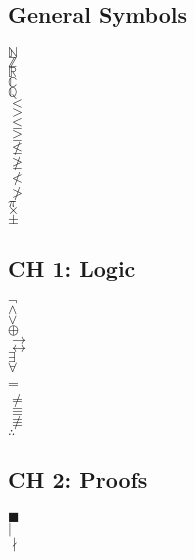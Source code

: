 \documentclass[letterpaper]{article}
\begin{document}
\begin{multicols*}{2}

\subsection*{General Symbols}
$\mathbb{N}$\\
$\mathbb{Z}$\\
$\mathbb{R}$\\
$\mathbb{C}$\\
$\mathbb{Q}$\\
$<$\\
$>$\\
$\leq$\\
$\geq$\\
$\nleq$\\
$\ngeq$\\
$\nless$\\
$\ngtr$\\
$\pi$\\
$\times$\\
$\pm$\\


\subsection*{CH 1: Logic}
$\neg$\\
$\land$\\
$\lor$\\
$\oplus$\\
$\to$\\
$\leftrightarrow$\\
$\exists$\\
$\forall$\\
=\\
$\neq$\\
$\equiv$\\
$\not\equiv$\\
$\therefore$\\

\subsection*{CH 2: Proofs}
$\blacksquare$\\
$\mid$\\
$\nmid$\\


\end{multicols*}
\end{document}
